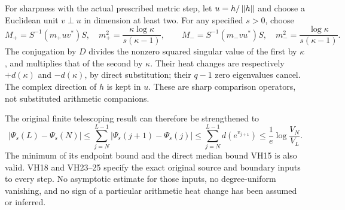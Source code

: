 \documentclass[11pt]{article}
\begin{document}
For sharpness with the actual prescribed metric step, let \(u=h/\left\lVert h\right\rVert\)
and choose a Euclidean unit \(v\perp u\) in dimension at least two.
For any specified \(s>0\), choose
\begin{equation}\tag{VH30}\label{VH30}
M_+=S^{-1}(m_+uv^*)S,\quad
m_+^2=\frac{\kappa\log\kappa}{s(\kappa-1)},\qquad
M_-=S^{-1}(m_-vu^*)S,\quad
m_-^2=\frac{\log\kappa}{s(\kappa-1)}.
\end{equation}
The conjugation by \(D\) divides the nonzero squared singular value
of the first by \(\kappa\), and multiplies that of the second by
\(\kappa\). Their heat changes are respectively
\(+d(\kappa)\) and \(-d(\kappa)\), by direct substitution; their
\(q-1\) zero eigenvalues cancel. The complex direction of \(h\) is
kept in \(u\). These are sharp comparison operators, not substituted
arithmetic companions.

The original finite telescoping result can therefore be strengthened to
\begin{equation}\tag{VH31}\label{VH31}
|\Psi_s(L)-\Psi_s(N)|\le
\sum_{j=N}^{L-1}|\Psi_s(j+1)-\Psi_s(j)|
\le\sum_{j=N}^{L-1}d(e^{v_{j+1}})
\le\frac1e\log\frac{V_N}{V_L}.
\end{equation}
The minimum of its endpoint bound and the direct median bound VH15 is
also valid. VH18 and VH23--25 specify the exact original source and
boundary inputs to every step. No asymptotic estimate for those inputs,
no degree-uniform vanishing, and no sign of a particular arithmetic
heat change has been assumed or inferred.
\end{document}
